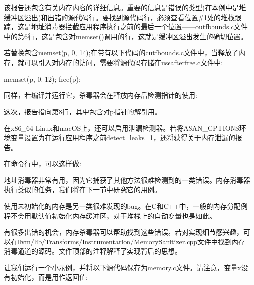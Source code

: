 该报告还包含有关内存内容的详细信息。重要的信息是错误的类型(在本例中是堆缓冲区溢出)和出错的源代码行。要找到源代码行，必须查看位置\#1处的堆栈跟踪，这是地址消毒器拦截应用程序执行之前的最后一个位置——outfbounds.c文件中的第6行，这是包含对memset()调用的行，这就是缓冲区溢出发生的确切位置。

若替换包含memset(p, 0, 14);在带有以下代码的outfbounds.c文件中，当释放了内存，就可以引入对内存的访问，需要将源代码存储在useafterfree.c文件中:

\begin{cpp}
memset(p, 0, 12);
free(p);
\end{cpp}

同样，若编译并运行它，杀毒器会在释放内存后检测指针的使用:


这次，报告指向第8行，其中包含对p指针的解引用。

在x86\_64 Linux和macOS上，还可以启用泄漏检测器。若将ASAN\_OPTIONS环境变量设置为在运行应用程序之前detect\_leaks=1，还将获得关于内存泄漏的报告。

在命令行中，可以这样做:


地址消毒器非常有用，因为它捕获了其他方法很难检测到的一类错误。内存消毒器执行类似的任务，我们将在下一节中研究它的用例。


使用未初始化的内存是另一类很难发现的bug。在C和C++中，一般的内存分配例程不会用默认值初始化内存缓冲区，对于堆栈上的自动变量也是如此。

有很多出错的机会，内存杀毒器可以帮助找到这些错误。若对实现细节感兴趣，可以在llvm/lib/Transforms/Instrumentation/MemorySanitizer.cpp文件中找到内存消毒通道的源码。文件顶部的注释解释了实现背后的思想。

让我们运行一个小示例，并将以下源代码保存为memory.c文件。请注意，变量x没有初始化，而是用作返回值:


